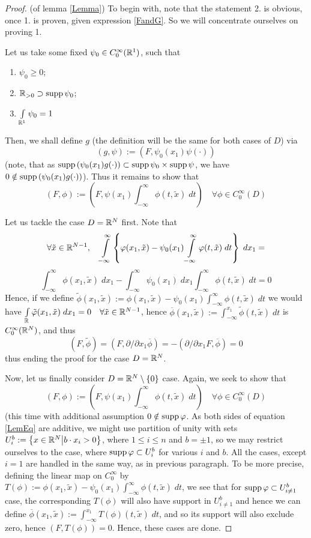\documentclass[10pt]{article} %
\begin{document}
	\begin{proof} (of lemma \ref{Lemma}) To begin with, note that the statement 2. is obvious, once 1. is proven, given expression
		\ref{FandG}. So we will concentrate ourselves on proving 1.

		Let us take some fixed $\psi_0\in C^\infty_0(\mathbb{R}^1)$, such that
		\newcommand{\tx}{\tilde{x}}
		\newcommand{\tp}{\tilde{\phi}}
		\begin{enumerate}
			\item $\psi_0\geq0$;
			\item $\mathbb{R}_{>0}\supset\operatorname{supp}\psi_0$;
			\item $\int_{\R^1}\psi_0=1$
		\end{enumerate}
		Then, we shall define $g$ (the definition will be the same for both cases of $D$) via
		\[(g,\psi):=(F,\psi_0(x_1)\psi(\cdot))\]
		(note, that as $\operatorname{supp}\left(\psi_0(x_1)g(\cdot)\right)\subset\operatorname{supp}\psi_0\times\operatorname{supp}\psi$, we have $0\notin\operatorname{supp}\left(\psi_0(x_1)g(\cdot)\right)$).
		Thus it remains to show that
		\begin{equation}(F,\phi):=(F,\psi(x_1)\int_{-\infty}^\infty\phi(t,\tilde{x})\;dt)\quad\forall\phi\in C^\infty_0(D)\label{LemEq}\end{equation}

		Let us tackle the case $D=\mathbb{R}^N$ first. Note that
		\[\forall\tilde{x}\in\R^{N-1},\quad\int_{-\infty}^\infty\mycbra{\phi(x_1,\tilde{x})-\psi_0(x_1)\int_{-\infty}^\infty\phi(t,\tilde{x})\;dt}\;
		dx_1=\]
		\[\int_{-\infty}^\infty\phi(x_1,\tilde{x})\;dx_1-\int_{-\infty}^\infty\psi_0(x_1)\;dx_1\int_{-\infty}^\infty\phi(t,\tilde{x})\;dt=0\]
		Hence, if we define $\tilde{\phi}(x_1,\tilde{x}):={\phi(x_1,\tilde{x})-\psi_0(x_1)\int_{-\infty}^\infty\phi(t,\tilde{x})\;dt}$
		we would have $\int_\R\tilde{\phi}(x_1,\tilde{x})\;dx_1=0\quad\forall\tilde{x}\in\R^{N-1}$, hence
		$\overline{\phi}(x_1,\tilde{x}):=\int_{-\infty}^{x_1}\tilde{\phi}(t,\tilde{x})\;dt$ is $C^\infty_0(\mathbb{R}^N)$, and thus
		\[(F,\tilde{\phi})=(F,\partial/\partial x_1\overline{\phi})=-(\partial/\partial x_1 F,\overline{\phi})=0\]
		thus ending the proof for the case $D=\mathbb{R}^N$.

		Now, let us finally consider $D=\mathbb{R}^N\setminus\left\{0\right\}$ case. Again, we seek to show that
		\[(F,\phi):=(F,\psi(x_1)\int_{-\infty}^\infty\phi(t,\tilde{x})\;dt)\quad\forall\phi\in C^\infty_0(D)\]
		(this time with additional assumption $0\notin\operatorname{supp}\varphi$. As both sides of equation \ref{LemEq} are additive,
		we might use partition of unity with sets $U_i^b:=\left\{x\in\mathbb{R}^N\big| b\cdot x_i >0\right\}$, where $1\leq i\leq n$ and $b=\pm1$,
		so we may restrict ourselves to the case, where $\operatorname{supp}\varphi\subset U_i^b$ for various $i$ and $b$. All the cases,
		except $i=1$ are handled in the same way, as in previous paragraph. To be more precise, defining the linear map on
		$C^\infty_0$ by $T(\phi):={\phi(x_1,\tilde{x})-\psi_0(x_1)\int_{-\infty}^\infty\phi(t,\tilde{x})\;dt}$, we see that
		for $\operatorname{supp}\varphi\subset U_{i\neq 1}^b$ case, the corresponding $T(\phi)$ will also have support in $U_{i\neq 1}^b$
		and hence we can define $\overline{\phi}(x_1,\tx):=\int_{-\infty}^{x_1}T(\phi)(t,\tx)\;dt$, and so its support
		will also exclude zero, hence $(F,T(\phi))=0$. Hence, these cases are done.


\end{proof}
\end{document}
